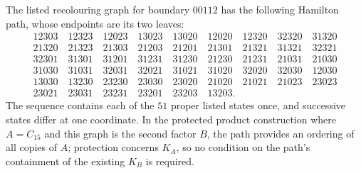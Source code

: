 The listed recolouring graph for boundary $00112$ has the following Hamilton
path, whose endpoints are its two leaves:
\[
\begin{array}{l}
12303\quad12323\quad12023\quad13023\quad13020\quad12020\quad12320\quad32320\quad31320\\
21320\quad21323\quad21303\quad21203\quad21201\quad21301\quad21321\quad31321\quad32321\\
32301\quad31301\quad31201\quad31231\quad31230\quad21230\quad21231\quad21031\quad21030\\
31030\quad31031\quad32031\quad32021\quad31021\quad31020\quad32020\quad32030\quad12030\\
13030\quad13230\quad23230\quad23030\quad23020\quad21020\quad21021\quad21023\quad23023\\
23021\quad23031\quad23231\quad23201\quad23203\quad13203.
\end{array}
\]
The sequence contains each of the $51$ proper listed states once, and
successive states differ at one coordinate. In the protected product
construction where $A=C_{15}$ and this graph is the second factor $B$, the
path provides an ordering of all copies of $A$; protection concerns $K_A$,
so no condition on the path's containment of the existing $K_B$ is required.
